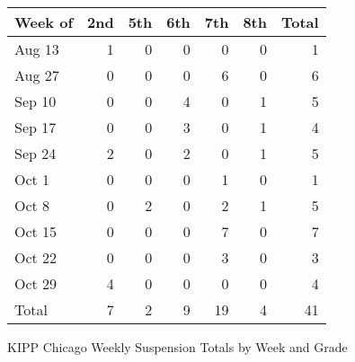 \documentclass[sfsidenotes, justified]{tufte-handout}\usepackage{graphicx, color}
\begin{document}
\begin{margintable}[3\baselineskip]

{\small
\begin{tabular}{lrrrrrr}
  \hline
Week of & 2nd & 5th & 6th & 7th & 8th & Total \\ 
  \hline
Aug 13 & 1 & 0 & 0 & 0 & 0 & 1 \\ 
  Aug 27 & 0 & 0 & 0 & 6 & 0 & 6 \\ 
  Sep 10 & 0 & 0 & 4 & 0 & 1 & 5 \\ 
  Sep 17 & 0 & 0 & 3 & 0 & 1 & 4 \\ 
  Sep 24 & 2 & 0 & 2 & 0 & 1 & 5 \\ 
  Oct 1 & 0 & 0 & 0 & 1 & 0 & 1 \\ 
  Oct 8 & 0 & 2 & 0 & 2 & 1 & 5 \\ 
  Oct 15 & 0 & 0 & 0 & 7 & 0 & 7 \\ 
  Oct 22 & 0 & 0 & 0 & 3 & 0 & 3 \\ 
  Oct 29 & 4 & 0 & 0 & 0 & 0 & 4 \\ 
  Total & 7 & 2 & 9 & 19 & 4 & 41 \\ 
   \hline
\end{tabular}
}



\caption{KIPP Chicago Weekly Suspension Totals by Week and Grade}
\end{margintable}
\end{document}
